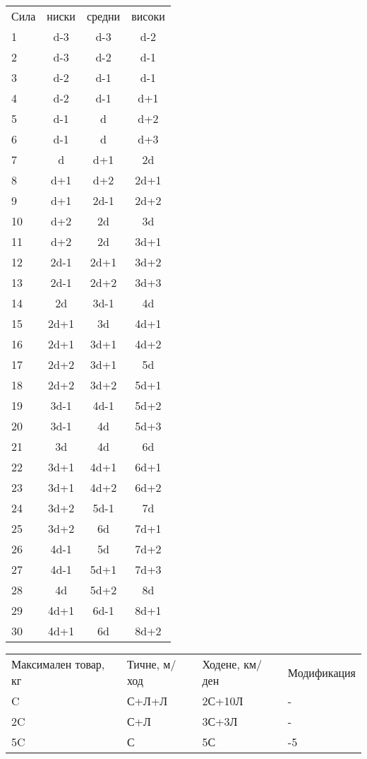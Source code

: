 \documentclass{article}
\begin{document}
\begin{multicols}{2}
\begin{footnotesize}
\extrarowsep=0cm
\noindent
{}
\begin{tabular}[b]{l | c | c | c}
Сила    & ниски & средни & високи  \\
1  & d-3  & d-3  & d-2   \\
2  & d-3  & d-2  & d-1   \\
3  & d-2  & d-1  & d-1   \\
4  & d-2  & d-1  & d+1   \\
5  & d-1  & d    & d+2   \\
6  & d-1  & d    & d+3   \\
7  & d    & d+1  & 2d    \\
8  & d+1  & d+2  & 2d+1  \\
9  & d+1  & 2d-1 & 2d+2  \\
10 & d+2  & 2d   & 3d    \\
11 & d+2  & 2d   & 3d+1  \\
12 & 2d-1 & 2d+1 & 3d+2  \\
13 & 2d-1 & 2d+2 & 3d+3  \\
14 & 2d   & 3d-1 & 4d    \\
15 & 2d+1 & 3d   & 4d+1  \\
16 & 2d+1 & 3d+1 & 4d+2  \\
17 & 2d+2 & 3d+1 & 5d    \\
18 & 2d+2 & 3d+2 & 5d+1  \\
19 & 3d-1 & 4d-1 & 5d+2  \\
20 & 3d-1 & 4d   & 5d+3  \\
21 & 3d   & 4d   & 6d    \\
22 & 3d+1 & 4d+1 & 6d+1  \\
23 & 3d+1 & 4d+2 & 6d+2  \\
24 & 3d+2 & 5d-1 & 7d    \\
25 & 3d+2 & 6d   & 7d+1  \\
26 & 4d-1 & 5d   & 7d+2  \\
27 & 4d-1 & 5d+1 & 7d+3  \\
28 & 4d   & 5d+2 & 8d    \\
29 & 4d+1 & 6d-1 & 8d+1  \\
30 & 4d+1 & 6d   & 8d+2
\end{tabular}

\vspace{0.3cm}
\noindent
{}
\begin{tabular}{p{1.4cm} | p{1.4cm} | p{1.4cm} | p{1.4cm}}
Максимален товар, кг & Тичне, м/ход & Ходене, км/ден & Модификация  \\
C                    & С+Л+Л        & 2С+10Л         & -            \\
2C                   & С+Л          & 3С+3Л          & -            \\
5C                   & С            & 5С             & -5
\end{tabular}
\end{footnotesize}
\end{multicols}
\end{document}
